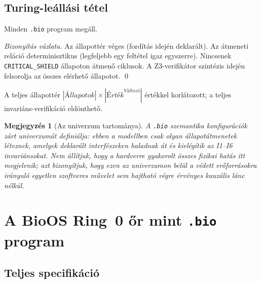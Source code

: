 \documentclass[11pt,a4paper,twoside]{article}
\newcommand{\tm}[1]{\texttt{#1}}
\newtheorem*{megjegyzes}{Megjegyzés}
\begin{document}
\subsection{Turing-leállási tétel}

\begin{tetel}[Leállás]\label{thm:leallas}
Minden \texttt{.bio} program megáll.
\end{tetel}
\begin{proof}[Bizonyítás vázlata]
Az állapottér véges (fordítás idején deklarált). Az átmeneti reláció determinisztikus
(legfeljebb egy feltétel igaz egyszerre). Nincsenek \tm{CRITICAL\_SHIELD} állapoton
átmenő ciklusok. A Z3-verifikátor szintézis idején felsorolja az összes elérhető
állapotot. \qed
\end{proof}

\begin{kovetkezmeny}
A teljes állapottér $|\textit{Állapotok}|\times|\textit{Érték}^{\textit{Változó}}|$
értékkel korlátozott; a teljes invariáns-verifikáció eldönthető.
\end{kovetkezmeny}

\begin{megjegyzes}[Az univerzum tartománya]
A \texttt{.bio} szemantika konfigurációk zárt univerzumát definiálja: ebben a
modellben csak olyan állapotátmenetek léteznek, amelyek deklarált interfészeken
haladnak át és kielégítik az I1--I6 invariánsokat. Nem állítjuk, hogy a hardverre
gyakorolt összes fizikai hatás itt megjelenik; azt bizonyítjuk, hogy ezen az
univerzumon belül a védett erőforrásokra irányuló egyetlen szoftveres művelet sem
hajtható végre érvényes kauzális lánc nélkül.
\end{megjegyzes}

\section{A BioOS Ring~0 őr mint \texttt{.bio} program}

\subsection{Teljes specifikáció}
\end{document}
